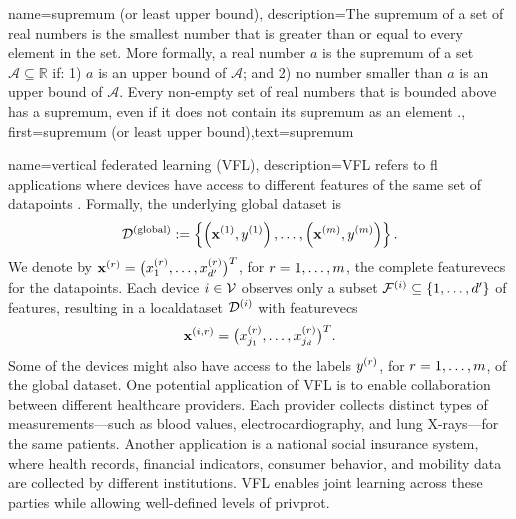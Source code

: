 {name=supremum (or least upper bound),
	description={The supremum of a set of real numbers is 
		the smallest number that is greater than or equal to every element in the set. More formally, a 
		real number $a$ is the supremum of a set $\mathcal{A} \subseteq \mathbb{R}$ if: 1) $a$ 
		is an upper bound of $\mathcal{A}$; and 2) no number smaller than $a$ is an upper bound of $\mathcal{A}$. 
		Every non-empty set of real numbers that is bounded above has a supremum, even if it does 
		not contain its supremum as an element \cite[Sec.~1.4]{RudinBookPrinciplesMatheAnalysis}.},
	first={supremum (or least upper bound)},text={supremum}
}

{name={vertical federated learning (VFL)},
	description={VFL refers to \gls{fl} applications where  
		\gls{device}s have access to different \gls{feature}s of the same set of \gls{datapoint}s \cite{VFLChapter}. 
		Formally, the underlying global \gls{dataset} is
		\[
		\mathcal{D}^{(\mathrm{global})} := \left\{ \left({\bf x}^{(1)}, y^{(1)}\right), \ldots, \left({\bf x}^{(m)}, y^{(m)}\right) \right\}.
		\]
		We denote by ${\bf x}^{(r)} = \big( x^{(r)}_{1}, \ldots, x^{(r)}_{d'} \big)^{T}$, for $r=1,\ldots,m$, 
	     	the complete \gls{featurevec}s for the \gls{datapoint}s. Each \gls{device} $i \in \mathcal{V}$ 
		observes only a subset $\mathcal{F}^{(i)} \subseteq \{1,\ldots,d'\}$ of \gls{feature}s, resulting 
		in a \gls{localdataset} $\mathcal{D}^{(i)}$ with \gls{featurevec}s
		\[
		{\bf x}^{(i,r)} = \big( x^{(r)}_{j_{1}}, \ldots, x^{(r)}_{j_{d}} \big)^{T}.
		\]
		Some of the \gls{device}s might also have access to the \gls{label}s $y^{(r)}$, for $r=1,\ldots,m$, 
		of the global \gls{dataset}. One potential application of VFL is to enable collaboration between 
		different healthcare providers. Each provider collects distinct types of measurements—such as blood 
		values, electrocardiography, and lung X-rays—for the same patients. Another application is a 
		national social insurance system, where health records, financial indicators, consumer behavior, 
		and mobility \gls{data} are collected by different institutions. VFL enables joint learning across 
		these parties while allowing well-defined levels of \gls{privprot}.
}}
